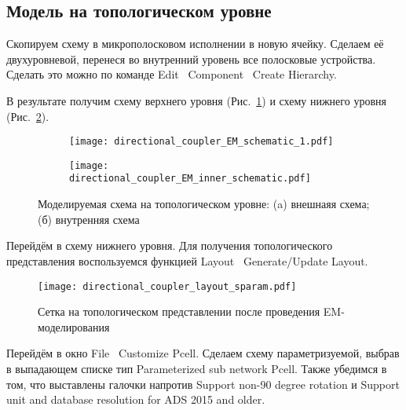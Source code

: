 \subsection{Модель на топологическом уровне}

Скопируем схему в микрополосковом исполнении в новую ячейку. Сделаем её двухуровневой, перенеся во внутренний уровень все полосковые устройства. Сделать это можно по команде Edit \textrightarrow\ Component \textrightarrow\ Create Hierarchy.

В результате получим схему верхнего уровня (Рис.~\ref{fig:directional_coupler_EM_schematic_1}) и схему нижнего уровня (Рис.~\ref{fig:directional_coupler_EM_inner_schematic}).

\begin{figure}[!ht]
    \centering
    \begin{subfigure}[b]{0.55\textwidth}
        \centering
        \texttt{[image: directional\_coupler\_EM\_schematic\_1.pdf]}
        \caption{}%
    \label{fig:directional_coupler_EM_schematic_1}
    \end{subfigure}
    \hfill
    \begin{subfigure}[b]{0.35\textwidth}
        \centering
        \texttt{[image: directional\_coupler\_EM\_inner\_schematic.pdf]}
        \caption{}%
    \label{fig:directional_coupler_EM_inner_schematic}
    \end{subfigure}
    \caption{%
        Моделируемая схема на топологическом уровне:
        (a) внешнаяя схема;
        (б) внутренняя схема
    }%
    \label{fig:directional_coupler_EM_schematics}
\end{figure}

Перейдём в схему нижнего уровня. Для получения топологического представления воспользуемся функцией Layout \textrightarrow\ Generate/Update Layout.

\begin{comment}
Топологическое представление создано верно (Рис.~\ref{fig:directional_coupler_layout_check}).

\begin{wrapfigure}{l}{0.4\textwidth}
    \centering
    \texttt{[image: directional\_coupler\_layout\_check.pdf]}
    \caption{Проверка топологического представления}%
    \label{fig:directional_coupler_layout_check}
\end{wrapfigure}
\end{comment}

\begin{wrapfigure}{r}{0.4\textwidth}
    \centering
    \texttt{[image: directional\_coupler\_layout\_sparam.pdf]}
    \caption{Сетка на топологическом представлении после проведения EM-моделирования}%
    \label{fig:directional_coupler_layout_sparam}
\end{wrapfigure}
Перейдём в окно File \textrightarrow\ Customize Pcell.
Сделаем схему параметризуемой, выбрав в выпадающем списке тип Parameterized sub network Pcell.
Также убедимся в том, что выставлены галочки напротив Support non-90 degree rotation и Support unit and database resolution for ADS 2015 and older.

